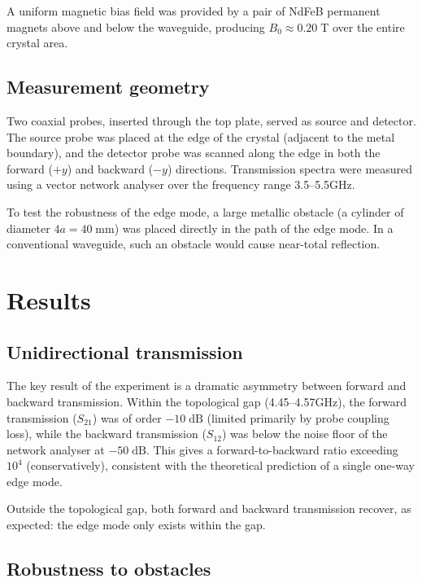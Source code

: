 A uniform magnetic bias field was provided by a pair of NdFeB permanent
magnets above and below the waveguide, producing $B_0\approx 0.20\;\mathrm{T}$
over the entire crystal area.

\subsection{Measurement geometry}
\label{sec:ch9-measurement}

Two coaxial probes, inserted through the top plate, served as source and
detector.  The source probe was placed at the edge of the crystal
(adjacent to the metal boundary), and the detector probe was scanned
along the edge in both the forward ($+y$) and backward ($-y$)
directions.  Transmission spectra were measured using a vector network
analyser over the frequency range 3.5--5.5\;GHz.

To test the robustness of the edge mode, a large metallic obstacle
(a cylinder of diameter $4a=40\;\mathrm{mm}$) was placed directly in
the path of the edge mode.  In a conventional waveguide, such an
obstacle would cause near-total reflection.

\section{Results}
\label{sec:ch9-results}

\subsection{Unidirectional transmission}
\label{sec:ch9-unidirectional}

The key result of the experiment is a dramatic asymmetry between
forward and backward transmission.  Within the topological gap
(4.45--4.57\;GHz), the forward transmission ($S_{21}$) was of order
$-10\;\mathrm{dB}$ (limited primarily by probe coupling loss), while
the backward transmission ($S_{12}$) was below the noise floor of the
network analyser at $-50\;\mathrm{dB}$.  This gives a forward-to-backward
ratio exceeding $10^4$ (conservatively), consistent with the theoretical
prediction of a single one-way edge mode.

Outside the topological gap, both forward and backward transmission
recover, as expected: the edge mode only exists within the gap.

\subsection{Robustness to obstacles}
\label{sec:ch9-robustness}

